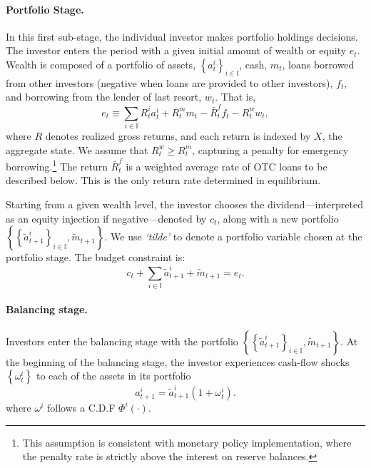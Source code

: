 \documentclass[12pt,american,english,notitlepage]{article}
\begin{document}
\paragraph*{Portfolio Stage.}

In this first sub-stage, the individual investor makes portfolio holdings
decisions. The investor enters the period with a given initial amount
of wealth or equity $e_{t}$. Wealth is composed of a portfolio of
assets, $\left\{ a_{t}^{i}\right\} _{i\in\mathbb{I}}$, cash, $m_{t}$,
loans borrowed from other investors (negative when loans are provided
to other investors), $f_{t}$, and borrowing from the lender of last
resort, $w_{t}$. That is, 
\begin{equation}
e_{t}\equiv\sum_{i\in\mathbb{I}}R_{t}^{i}a_{t}^{i}+R_{t}^{m}m_{t}-\bar{R}_{t}^{f}f_{t}-R_{t}^{w}w_{t},\label{eq:e.accumulation}
\end{equation}
where $R$ denotes realized gross returns, and each return is indexed
by $X$, the aggregate state. We assume that $R_{t}^{w}\ge R_{t}^{m}$,
 capturing a penalty for emergency borrowing.\footnote{This assumption is consistent with monetary policy implementation,
where the penalty rate is strictly above the interest on reserve
balances.} The return $\bar{R}_{t}^{f}$ is a weighted average rate
of OTC loans to be described below. This is the only return rate determined
in equilibrium. 

Starting from a given wealth level, the investor chooses the dividend---interpreted
as an equity injection if negative---denoted by $c_{t}$, along with
a new portfolio $\left\{ \left\{ \tilde{a}_{t+1}^{i}\right\} _{i\in\mathbb{I}},\tilde{m}_{t+1}\right\} $.
We use \textit{`tilde'} to denote a portfolio variable chosen at the
portfolio stage. The budget constraint is: 
\[
c_{t}+\sum_{i\in\mathbb{I}}\tilde{a}_{t+1}^{i}+\tilde{m}_{t+1}=e_{t}.
\]


\paragraph*{Balancing stage.}

Investors enter the balancing stage with the portfolio $\left\{ \left\{ \tilde{a}_{t+1}^{i}\right\} _{i\in\mathbb{I}},\tilde{m}_{t+1}^ {}\right\} $.
At the beginning of the balancing stage, the investor experiences
cash-flow shocks $\left\{ \omega_{t}^{i}\right\} $ to each of the
assets in its portfolio 
\begin{equation}
a_{t+1}^{i}=\tilde{a}_{t+1}^{i}(1+\omega_{t}^{i}).\label{eq:motion_Dep}
\end{equation}
where $\omega^{i}$ follows a C.D.F $\Phi^{i}\left(\cdot\right)$.
\end{document}
